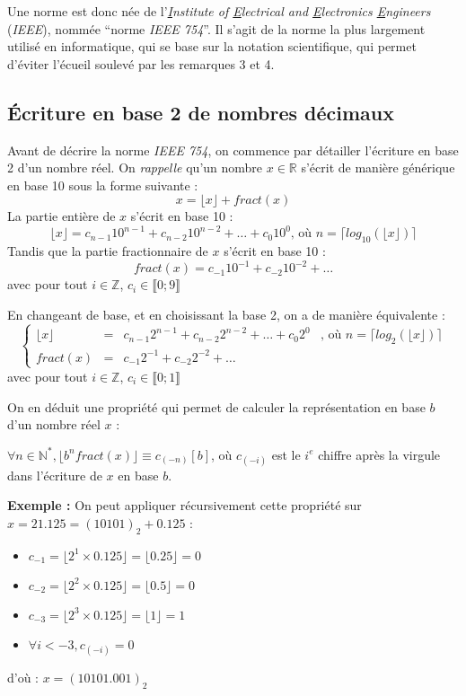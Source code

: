 \documentclass[../../main.tex]{subfiles}
\begin{document}
Une norme est donc née de l'\textit{\underline{I}nstitute of \underline{E}lectrical and \underline{E}lectronics \underline{E}ngineers} (\textit{IEEE}), nommée ``norme \textit{IEEE 754}''. Il s'agit de la norme la plus largement utilisé en informatique, qui se base sur la notation scientifique, qui permet d'éviter l'écueil soulevé par les remarques 3 et 4.
\subsection{Écriture en base 2 de nombres décimaux} \label{sub:_criture_en_base_2_de_nombres_d_cimaux}
Avant de décrire la norme \textit{IEEE 754}, on commence par détailler l'écriture en base 2 d'un nombre réel. 
On \textit{rappelle} qu'un nombre $x\in{\mathbb{R}}$ s'écrit de manière générique en base 10 sous la forme suivante :
$$x = \lfloor{x}\rfloor + fract(x)$$
La partie entière de $x$ s'écrit en base 10 : 
$$\lfloor{x}\rfloor = c_{n-1}10^{n-1} + c_{n-2}10^{n-2} + \dots + c_{0}10^{0}\text{, où $n = \lceil log_{10}(\lfloor{x}\rfloor)\rceil$}$$
Tandis que la partie fractionnaire de $x$ s'écrit en base 10 :
$$fract(x) = c_{-1}10^{-1} + c_{-2}10^{-2} + \dots$$
avec pour tout $i\in\mathbb{Z}$, $c_{i}\in{\llbracket{0; 9\rrbracket}}$

En changeant de base, et en choisissant la base 2, on a de manière équivalente :
$$\left\{\begin{array}{lcll}
\lfloor{x}\rfloor & = & c_{n-1}2^{n-1} + c_{n-2}2^{n-2} + \dots + c_{0}2^{0} & \text{, où $n = \lceil log_{2}(\lfloor{x}\rfloor)\rceil$} \\
fract(x) & = & c_{-1}2^{-1} + c_{-2}2^{-2} + \dots
\end{array}\right.$$
avec pour tout $i\in\mathbb{Z}$, $c_{i}\in{\llbracket{0; 1\rrbracket}}$

On en déduit une propriété qui permet de calculer la représentation en base $b$ d'un nombre réel $x$ :

\proposition{} $\forall{n\in{\mathbb{N}^{*}}}, \lfloor b^{n}fract(x)\rfloor \equiv c_{(-n)}[b]$, où $c_{(-i)}$ est le $i^e$ chiffre après la virgule dans l'écriture de $x$ en base $b$.

\textbf{Exemple :} On peut appliquer récursivement cette propriété sur $x = 21.125 = (10101)_{2} + 0.125$ :
\begin{itemize}
     \item $c_{-1} = \lfloor 2^{1}\times{0.125} \rfloor = \lfloor 0.25\rfloor = 0$
     \item $c_{-2} = \lfloor 2^{2}\times{0.125} \rfloor = \lfloor 0.5\rfloor = 0$
     \item $c_{-3} = \lfloor 2^{3}\times{0.125} \rfloor = \lfloor 1\rfloor = 1$
     \item $\forall{i < -3}, c_{(-i)} = 0$
\end{itemize}
d'où : $x = (10101.001)_{2}$
\end{document}
